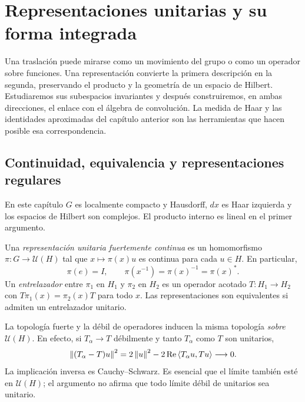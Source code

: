 \chapter{Representaciones unitarias y su forma integrada}\label{cap:v4-13}
Una traslación puede mirarse como un movimiento del grupo o como un operador sobre funciones. Una representación convierte la primera descripción en la segunda, preservando el producto y la geometría de un espacio de Hilbert. Estudiaremos sus subespacios invariantes y después construiremos, en ambas direcciones, el enlace con el álgebra de convolución. La medida de Haar y las identidades aproximadas del capítulo anterior son las herramientas que hacen posible esa correspondencia.

\section{Continuidad, equivalencia y representaciones regulares}\label{lectura:v4-23}
En este capítulo $G$ es localmente compacto y Hausdorff, $dx$ es Haar izquierda y los espacios de Hilbert son complejos. El producto interno es lineal en el primer argumento.
\begin{definicion}
Una \emph{representación unitaria fuertemente continua} es un homomorfismo $\pi:G\to\mathcal U(H)$ tal que $x\mapsto\pi(x)u$ es continua para cada $u\in H$. En particular,
\[
\pi(e)=I,\qquad \pi(x^{-1})=\pi(x)^{-1}=\pi(x)^*.
\]
Un \emph{entrelazador} entre $\pi_1$ en $H_1$ y $\pi_2$ en $H_2$ es un operador acotado $T:H_1\to H_2$ con $T\pi_1(x)=\pi_2(x)T$ para todo $x$. Las representaciones son equivalentes si admiten un entrelazador unitario.
\end{definicion}
La topología fuerte y la débil de operadores inducen la misma topología \emph{sobre} $\mathcal U(H)$. En efecto, si $T_\alpha\to T$ débilmente y tanto $T_\alpha$ como $T$ son unitarios,
\[
\left\lVert(T_\alpha-T)u\right\rVert^2=2\left\lVert u\right\rVert^2-2\operatorname{Re}\left\langle T_\alpha u,Tu\right\rangle\longrightarrow0.
\]
La implicación inversa es Cauchy--Schwarz. Es esencial que el límite también esté en $\mathcal U(H)$; el argumento no afirma que todo límite débil de unitarios sea unitario.

